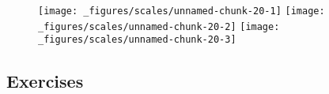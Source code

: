 \begin{Shaded}
\begin{Highlighting}[]
\StringTok{ }\NormalTok{(} \OperatorTok{:}\NormalTok{)}
\StringTok{ }\NormalTok{)) }\OperatorTok{+}\StringTok{ }\NormalTok{(}\NormalTok{(} \NormalTok{)}
\OperatorTok{+}\StringTok{ }\NormalTok{(} \NormalTok{(}\NormalTok{, }\NormalTok{))}
\OperatorTok{+}\StringTok{ }\NormalTok{(} \NormalTok{(}\NormalTok{, }\NormalTok{), }\OperatorTok{::}
\end{Highlighting}
\end{Shaded}

\begin{figure}[H]
  \centering
  \texttt{[image: \_figures/scales/unnamed-chunk-20-1]}%
  \texttt{[image: \_figures/scales/unnamed-chunk-20-2]}%
  \texttt{[image: \_figures/scales/unnamed-chunk-20-3]}
\end{figure}

\hypertarget{exercises-3}{%
\subsection{Exercises}\label{exercises-3}}

